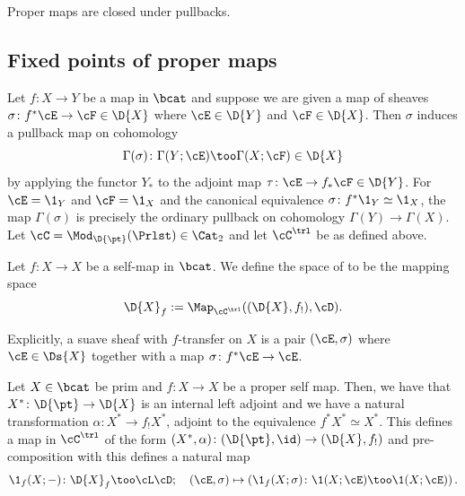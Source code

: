 \begin{lem}
  Proper maps are closed under pullbacks.
\end{lem}

\subsection{Fixed points of proper maps}

Let $f\colon X\to Y$ be a map in $\bcat$ and suppose we are given a map of sheaves
$\sigma \colon f^{\ast}\cE \to \cF \in \D{X}$ where $\cE\in \D{Y}$ and $\cF\in \D{X}$. Then $\sigma$
induces a pullback map on cohomology
\[ \Gamma(\sigma)\colon \Gamma(Y;\cE) \too \Gamma(X;\cF) \in \D{X}\] by applying the functor $Y_{\ast}$ to the
adjoint map $\tau\colon \cE \to f_{\ast}\cF \in \D{Y}$. For $\cE= \1_{Y}$ and $\cF=\1_{X}$ and
the canonical equivalence $\sigma \colon f^{\ast}\1_{Y}\simeq \1_{X}$, the map $\Gamma(\sigma)$ is precisely
the ordinary pullback on cohomology $\Gamma(Y) \to \Gamma(X)$.\\
Let $\cC=\Mod_{\D{\pt}}(\Prlst)\in \Cat_{2}$ and let $\cC^{\trl}$ be as defined above.

\begin{defn}
  Let $f\colon X\to X$ be a self-map in $\bcat$. We define the space of
   to be the mapping space
  \[\D{X}_{f}:= \Map_{\cC^{\trl}}((\D{X},f_{!}), \cD).\]
\end{defn}

 Explicitly, a suave sheaf with $f$-transfer on
  $X$ is a pair $(\cE, \sigma)$ where $\cE\in \Ds{X}$ together with a
  map $\sigma \colon f^{\ast}\cE\to \cE$.

\begin{cons}
  Let $X\in \bcat$ be prim and $f\colon X\to X$ be a proper self map. Then, we have
  that $X^{\ast}\colon \D{\pt}\to \D{X}$ is an internal left adjoint and we have a natural
  transformation $\alpha\colon X^{\ast}\to f_{!}X^{\ast}$, adjoint to the equivalence
  $f^{\ast}X^{\ast}\simeq X^{\ast}$. This defines a map in $\cC^{\trl}$ of the form
  $(X^{\ast},\alpha) \colon (\D{\pt},\id) \to (\D{X},f_{!})$ and pre-composition with this
  defines a natural map
  \[ \1_{f}(X;-)\colon \D{X}_{f}\too \cL\cD;\quad
    (\cE,\sigma)\mapsto \left(\1_{f}(X;\sigma)\colon \1(X;\cE)
      \too \1(X;\cE)\right).\]
\end{cons}


